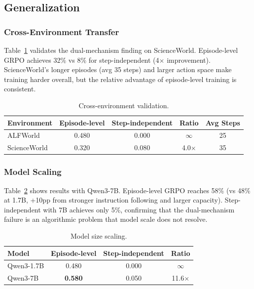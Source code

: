 \documentclass[11pt]{article}
\begin{document}
\subsection{Generalization}

\subsubsection{Cross-Environment Transfer}

Table~\ref{tab:transfer} validates the dual-mechanism finding on ScienceWorld. Episode-level GRPO achieves 32\% vs 8\% for step-independent (4$\times$ improvement). ScienceWorld's longer episodes (avg 35 steps) and larger action space make training harder overall, but the relative advantage of episode-level training is consistent.

\begin{table}[h]
\centering
\caption{Cross-environment validation.}
\label{tab:transfer}
\begin{tabular}{lcccc}
\toprule
Environment & Episode-level & Step-independent & Ratio & Avg Steps \\
\midrule
ALFWorld & 0.480 & 0.000 & $\infty$ & 25 \\
ScienceWorld & 0.320 & 0.080 & 4.0$\times$ & 35 \\
\bottomrule
\end{tabular}
\end{table}

\subsubsection{Model Scaling}

Table~\ref{tab:scaling} shows results with Qwen3-7B. Episode-level GRPO reaches 58\% (vs 48\% at 1.7B, +10pp from stronger instruction following and larger capacity). Step-independent with 7B achieves only 5\%, confirming that the dual-mechanism failure is an algorithmic problem that model scale does not resolve.

\begin{table}[h]
\centering
\caption{Model size scaling.}
\label{tab:scaling}
\begin{tabular}{lccc}
\toprule
Model & Episode-level & Step-independent & Ratio \\
\midrule
Qwen3-1.7B & 0.480 & 0.000 & $\infty$ \\
Qwen3-7B & \textbf{0.580} & 0.050 & 11.6$\times$ \\
\bottomrule
\end{tabular}
\end{table}
\end{document}
